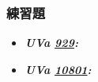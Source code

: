 \subsubsection*{練習題}
\begin{itemize}[label={\Checkmark}]
\item \textbf{\textit{UVa \href{http://uva.onlinejudge.org/external/9/929.html}{929}: }}\\

\item \textbf{\textit{UVa \href{http://uva.onlinejudge.org/external/108/10801.html}{10801}: }}\\

\end{itemize}